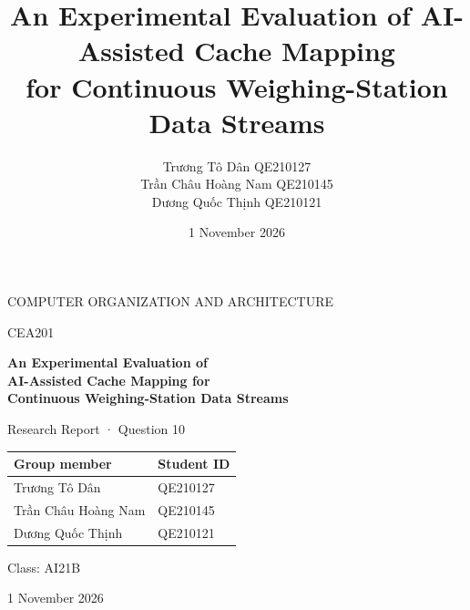 \documentclass[11pt,a4paper]{article}
\title{An Experimental Evaluation of AI-Assisted Cache Mapping\\for Continuous Weighing-Station Data Streams}
\author{Trương Tô Dân \quad QE210127\\Trần Châu Hoàng Nam \quad QE210145\\Dương Quốc Thịnh \quad QE210121}
\date{1 November 2026}
\begin{document}
\hypersetup{pageanchor=false}
\begin{titlepage}
\centering
\vspace*{18mm}
{\large COMPUTER ORGANIZATION AND ARCHITECTURE\par}
\vspace{4mm}
{\large CEA201\par}
\vspace{20mm}
{\LARGE\bfseries An Experimental Evaluation of\\[3mm] AI-Assisted Cache Mapping for\\[3mm] Continuous Weighing-Station Data Streams\par}
\vspace{12mm}
{\large Research Report · Question 10\par}
\vspace{18mm}
\begin{tabular}{ll}
\toprule
\textbf{Group member} & \textbf{Student ID}\\
\midrule
Trương Tô Dân & QE210127\\
Trần Châu Hoàng Nam & QE210145\\
Dương Quốc Thịnh & QE210121\\
\bottomrule
\end{tabular}
\vspace{12mm}

{\large Class: AI21B\par}
\vfill
{\large 1 November 2026\par}
\end{titlepage}
\setcounter{page}{1}
\hypersetup{pageanchor=true}
\end{document}
